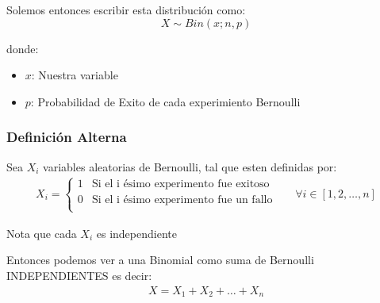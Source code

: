 \documentclass[12pt, fleqn]{report}                             %
\DeclareMathOperator \Space     {\quad}                         %
\theoremstyle{break}                                            %
\begin{document}
                    Solemos entonces escribir esta distribución como:
                    \begin{equation*}
                        X \sim Bin(x; n, p)
                    \end{equation*}

                    donde:
                    \begin{itemize}
                        \item $x$: Nuestra variable
                        \item $p$: Probabilidad de Exito de cada experimiento Bernoulli
                    \end{itemize}


                \vspace{1em}
                \subsubsection{Definición Alterna}

                    Sea $X_i$ variables aleatorias de Bernoulli, tal que esten
                    definidas por: 
                    \begin{align*}
                        X_i = 
                            \begin{cases}
                                1 & \text{Si el i ésimo experimento fue exitoso}        \\
                                0 & \text{Si el i ésimo experimento fue un fallo}       \\
                            \end{cases}
                            \Space
                            \forall i \in [1, 2, \dots, n]
                    \end{align*}

                    Nota que cada $X_i$ es independiente

                    Entonces podemos ver a una Binomial como suma de Bernoulli INDEPENDIENTES es decir:
                    \begin{align*}
                        X = X_1 + X_2 + \dots + X_n
                    \end{align*}
\end{document}
